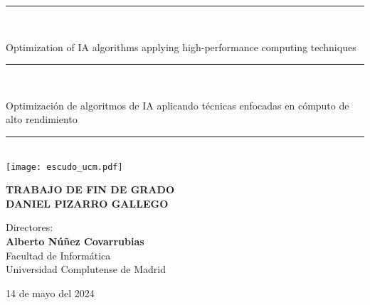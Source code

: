 \begin{titlepage}
	\thispagestyle{empty}

	\begin{center}

		\vspace{1cm}

		\vspace{0.65cm}
		\rule{2in}{0.5pt}\\
		\vspace{0.85cm}

		{\Large Optimization of IA algorithms applying high-performance computing techniques}\\

		\vspace{0.65cm}
		\rule{2in}{0.5pt}\\
		\vspace{0.85cm}

		{\Large Optimización de algoritmos de IA aplicando técnicas enfocadas en cómputo de alto rendimiento}\\

		\vspace{0.65cm}
		\rule{2in}{0.5pt}\\



		\vfill
		\texttt{[image: escudo\_ucm.pdf]}
		\vfill

		

		\textbf{TRABAJO DE FIN DE GRADO}\\
		\vspace{0.7cm}
		\textbf{DANIEL PIZARRO GALLEGO}

		\vspace{1cm}

		Directores:\\
		\textbf{Alberto Núñez Covarrubias}\\

		\vspace{1.8cm}
		Facultad de Informática\\
		Universidad Complutense de Madrid
		\vspace{0.5cm}
	   
		14 de mayo del 2024

		\vspace{0.2cm}

	\end{center}
\end{titlepage}